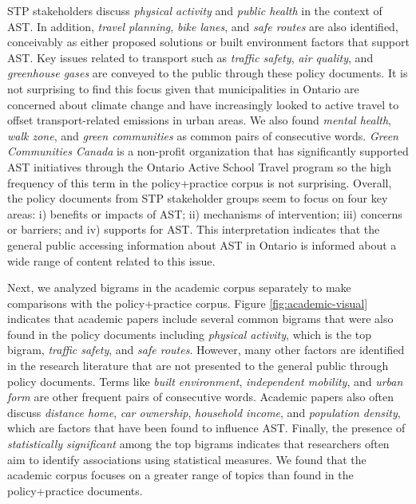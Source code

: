 \documentclass[preprint, 3p,
authoryear]{elsarticle} %
\begin{document}
STP stakeholders discuss \emph{physical activity} and \emph{public
health} in the context of AST. In addition, \emph{travel planning},
\emph{bike lanes}, and \emph{safe routes} are also identified,
conceivably as either proposed solutions or built environment factors
that support AST. Key issues related to transport such as \emph{traffic
safety}, \emph{air quality}, and \emph{greenhouse gases} are conveyed to
the public through these policy documents. It is not surprising to find
this focus given that municipalities in Ontario are concerned about
climate change and have increasingly looked to active travel to offset
transport-related emissions in urban areas. We also found \emph{mental
health}, \emph{walk zone}, and \emph{green communities} as common pairs
of consecutive words. \emph{Green Communities Canada} is a non-profit
organization that has significantly supported AST initiatives through
the Ontario Active School Travel program so the high frequency of this
term in the policy+practice corpus is not surprising. Overall, the
policy documents from STP stakeholder groups seem to focus on four key
areas: i) benefits or impacts of AST; ii) mechanisms of intervention;
iii) concerns or barriers; and iv) supports for AST. This interpretation
indicates that the general public accessing information about AST in
Ontario is informed about a wide range of content related to this issue.

Next, we analyzed bigrams in the academic corpus separately to make
comparisons with the policy+practice corpus. Figure
\ref{fig:academic-visual} indicates that academic papers include several
common bigrams that were also found in the policy documents including
\emph{physical activity}, which is the top bigram, \emph{traffic
safety}, and \emph{safe routes}. However, many other factors are
identified in the research literature that are not presented to the
general public through policy documents. Terms like \emph{built
environment}, \emph{independent mobility}, and \emph{urban form} are
other frequent pairs of consecutive words. Academic papers also often
discuss \emph{distance home}, \emph{car ownership}, \emph{household
income}, and \emph{population density}, which are factors that have been
found to influence AST. Finally, the presence of \emph{statistically
significant} among the top bigrams indicates that researchers often aim
to identify associations using statistical measures. We found that the
academic corpus focuses on a greater range of topics than found in the
policy+practice documents.
\end{document}
